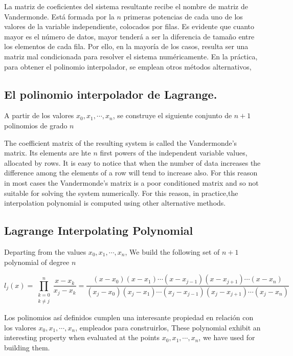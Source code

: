 \begin{paracol}{2}
La matriz de coeficientes del sistema resultante recibe el nombre de matriz de Vandermonde. Está formada por la $n$ primeras potencias de cada uno de los valores de la variable independiente, colocados por filas. Es evidente que cuanto mayor es el número de datos, mayor tenderá a ser la diferencia de tamaño entre los elementos de cada fila. Por ello, en la mayoría de los casos, resulta ser una matriz mal condicionada para resolver el sistema numéricamente. En la práctica, para obtener el polinomio interpolador, se emplean otros métodos alternativos,

\subsection{El polinomio interpolador de Lagrange.} \label{sec:lagranje} 

A partir de los valores $x_0, x_1,\cdots, x_n$, se construye el siguiente conjunto de $n+1$ polinomios de grado $n$

\switchcolumn
The coefficient matrix of the resulting system is called the Vandermonde's matrix. Its elements are hte $n$ first powers of the independent variable values, allocated by rows. It is easy to notice that when the number of data increases the difference among the elements of a row will tend to increase also. For this reason in most cases the Vandermonde's matrix is a poor conditioned matrix and so not suitable for solving the system numerically.  For this reason, in practice,the interpolation polynomial is computed using other alternative methods.  

\subsection{Lagrange Interpolating Polynomial} 
Departing from the values $x_0,x_1,\cdots,x_n$, We build the following set of $n+1$ polynomial of degree $n$ 
\end{paracol}
\begin{equation*}
l_j(x)=\prod_{\substack{k=0\\
k\neq j}}^n\frac{x-x_k}{x_j-x_k}=\frac{(x-x_0)(x-x_1)\cdots(x-x_{j-1})(x-x_{j+1})\cdots(x-x_n)}{(x_j-x_0)(x_j-x_1)\cdots(x_j-x_{j-1})(x_j-x_{j+1})\cdots(x_j-x_n)}
\end{equation*}
\begin{paracol}{2}
Los polinomios así definidos cumplen una interesante propiedad en  relación con los valores $x_0, x_1,\cdots, x_n$, empleados para construirlos,
\switchcolumn
These polynomial exhibit an interesting property when evaluated at the points $x_0, x_1,\cdots, x_n$, we have used for building them.
\end{paracol}

